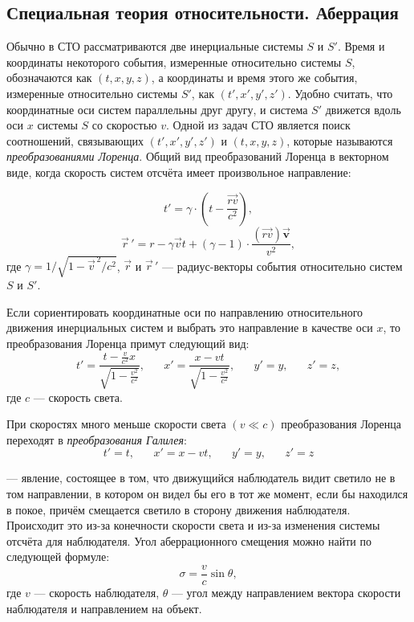 \subsection{Специальная теория относительности. Аберрация}

Обычно в СТО рассматриваются две инерциальные системы $S$ и $S'$. Время и координаты некоторого события, измеренные относительно системы $S$, обозначаются как $(t, x, y, z)$, а координаты и время этого же события, измеренные относительно системы $S'$, как $(t', x', y', z')$. Удобно считать, что координатные оси систем параллельны друг другу, и система $S'$ движется вдоль оси $x$ системы $S$ со скоростью $v$. Одной из задач СТО является поиск соотношений, связывающих $(t', x', y', z')$ и $(t, x, y, z)$, которые называются \textit{преобразованиями Лоренца}. Общий вид преобразований Лоренца в векторном виде, когда скорость систем отсчёта имеет произвольное направление:

\begin{equation}
t'=\gamma\cdot \left(t-\frac{\vec{rv}}{c^2}\right),
\end{equation}
\begin{equation}
\vec{r}\,'=r-\gamma \vec{v}t+(\gamma-1)\cdot\frac{(\vec{rv})\vec{\mathbf v}}{v^2},
\end{equation}
где  $\gamma=1/{\sqrt {1-\vec{v}^{\,2}/c^{2}}}$, $\vec{r}$ и $\vec{r}\,'$ --- радиус-векторы события относительно систем $S$ и $S'$.

Если сориентировать координатные оси по направлению относительного движения инерциальных систем и выбрать это направление в качестве оси $x$, то преобразования Лоренца примут следующий вид: 
\begin{equation}
t'=\frac{t-\frac{v}{c^2}x}{\sqrt{1-\frac{v^2}{c^2}}},\quad\text{  } x'=\frac{x-vt}{\sqrt{1-\frac{v^2}{c^2}}},\quad\text{  } y'=y,\quad\text{  } z'=z,
\end{equation}
где $c$ --- скорость света.

 При скоростях много меньше скорости света $(v\ll c)$ преобразования Лоренца переходят в \textit{преобразования Галилея}:
\begin{equation}
 t'=t,\quad\text{  } x'=x-vt,\quad\text{  }  y'=y,\quad\text{  }  z'=z
\end{equation}
 
 --- явление, состоящее в том, что движущийся наблюдатель видит светило не в том направлении, в котором он видел бы его в тот же момент, если бы находился в покое, причём смещается светило в сторону движения наблюдателя. Происходит это из-за конечности скорости света и из-за изменения системы отсчёта для наблюдателя.  
Угол аберрационного смещения можно найти по следующей формуле:
\begin{equation}\sigma=\frac{v}{c}\sin\theta,
\end{equation}
где $v$ --- скорость наблюдателя, $\theta$ --- угол между направлением вектора скорости наблюдателя и направлением на объект. 